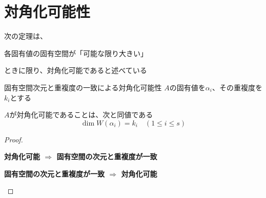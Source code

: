 \documentclass[../../../topic_linear-algebra]{subfiles}
\begin{document}
\sectionline
\section{対角化可能性}

次の定理は、
\begin{shaded}
  各固有値の固有空間が「可能な限り大きい」
\end{shaded}
ときに限り、対角化可能であると述べている

\begin{theorem}{固有空間次元と重複度の一致による対角化可能性}
  $A$の固有値を$\alpha_i$、その重複度を$k_i$とする

  $A$が対角化可能であることは、次と同値である
  \begin{equation*}
    \dim W(\alpha_i) = k_i \quad (1 \leq i \leq s)
  \end{equation*}
\end{theorem}

\begin{proof}
  \begin{subpattern}{\bfseries 対角化可能 $\Longrightarrow$ 固有空間の次元と重複度が一致}
  \end{subpattern}

  \begin{subpattern}{\bfseries 固有空間の次元と重複度が一致 $\Longrightarrow$ 対角化可能}
  \end{subpattern}
\end{proof}
\end{document}
